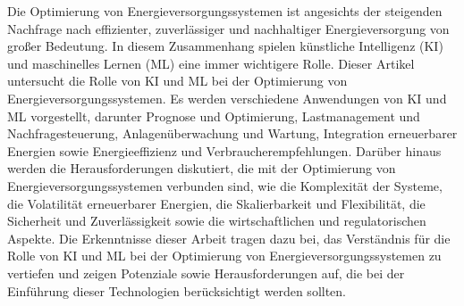 Die Optimierung von Energieversorgungssystemen ist angesichts der steigenden
Nachfrage nach effizienter, zuverlässiger und nachhaltiger Energieversorgung
von großer Bedeutung. In diesem Zusammenhang spielen künstliche Intelligenz
(KI) und maschinelles Lernen (ML) eine immer wichtigere Rolle. Dieser Artikel
untersucht die Rolle von KI und ML bei der Optimierung von
Energieversorgungssystemen. Es werden verschiedene Anwendungen von KI und ML
vorgestellt, darunter Prognose und Optimierung, Lastmanagement und
Nachfragesteuerung, Anlagenüberwachung und Wartung, Integration erneuerbarer
Energien sowie Energieeffizienz und Verbraucherempfehlungen. Darüber hinaus
werden die Herausforderungen diskutiert, die mit der Optimierung von
Energieversorgungssystemen verbunden sind, wie die Komplexität der Systeme, die
Volatilität erneuerbarer Energien, die Skalierbarkeit und Flexibilität, die
Sicherheit und Zuverlässigkeit sowie die wirtschaftlichen und regulatorischen
Aspekte. Die Erkenntnisse dieser Arbeit tragen dazu bei, das Verständnis für
die Rolle von KI und ML bei der Optimierung von Energieversorgungssystemen zu
vertiefen und zeigen Potenziale sowie Herausforderungen auf, die bei der
Einführung dieser Technologien berücksichtigt werden sollten.\\